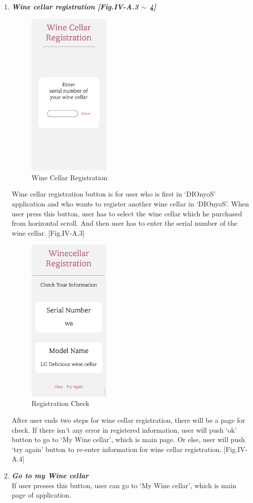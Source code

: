 \documentclass[conference]{IEEEtran}
\numberwithin{figure}{subsection}
\begin{document}
\begin{enumerate}
    \item \textit{\textbf{Wine cellar registration [Fig.IV-A.3 $\sim$ 4]}}\\
    \begin{figure}[htb!]
        \centerline{\includegraphics[width=4cm]{winecellarregi.png}}
        \caption{Wine Cellar Registration}
    \end{figure}
    Wine cellar registration button is for user who is first in ‘DIOnyoS’ application and who wants to register another wine cellar in ‘DIOnyoS’. When user press this button, user has to select the wine cellar which he purchased from horizontal scroll. And then user has to enter the serial number of the wine cellar. [Fig.IV-A.3]\\
    \begin{figure}[htb!]
        \centerline{\includegraphics[width=4cm]{regicheck.png}}
        \caption{Registration Check}
    \end{figure}
    After user ends two steps for wine cellar registration, there will be a page for check. If there isn’t any error in registered information, user will push ‘ok’ button to go to ‘My Wine cellar’, which is main page. Or else, user will push ‘try again’ button to re-enter information for wine cellar registration. [Fig.IV-A.4]
    \item \textit{\textbf{Go to my Wine cellar}}\\
    If user presses this button, user can go to ‘My Wine cellar’, which is main page of application.
\end{enumerate}
\end{document}
